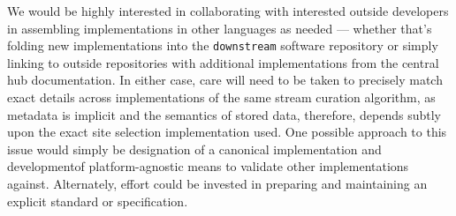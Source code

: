 We would be highly interested in collaborating with interested outside developers in assembling implementations in other languages as needed --- whether that's folding new implementations into the \texttt{downstream} software repository or simply linking to outside repositories with additional implementations from the central hub documentation.
In either case, care will need to be taken to precisely match exact details across implementations of the same stream curation algorithm, as  metadata is implicit and the semantics of stored data, therefore, depends subtly upon the exact site selection implementation used.
One possible approach to this issue would simply be designation of a canonical implementation and developmentof platform-agnostic means to validate other implementations against.
Alternately, effort could be invested in preparing and maintaining an explicit standard or specification.
